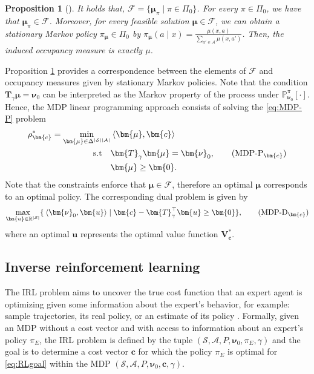 \documentclass[10pt]{article} %
\newtheorem{proposition}{Proposition}
\def\Ac{\ensuremath{\mathcal{A}}}
\def\F{\ensuremath{\mathcal{F}}}
\def\sP{{\mathbb{P}}}
\def\mTg{{\bm{T}}_\gamma}
\def\vzero{{\bm{0}}}
\def\vc{{\bm{c}}}
\def\vu{{\bm{u}}}
\def\vV{{\bm{V}}}
\def\vmu{{\bm{\mu}}}
\def\vnu{{\bm{\nu}}}
\def\evmu{{\mu}}
\newcommand{\R}{\mathbb{R}}
\newcommand{\St}{\mathcal{S}}
\begin{document}
\begin{proposition}[\cite{Puterman1994}] \label{prop:puterman}
It holds that, $\F = \{\vmu_{\pi} \mid \pi \in \Pi_0\}$. 
For every \( \pi \in \Pi_0 \), we have that \( \vmu_{\pi} \in \F \). Moreover, for every feasible solution \( \vmu \in \F \), we can obtain a stationary Markov policy \( \pi_{\vmu} \in \Pi_0 \) by $
\pi_{\vmu}(a \mid x) = \frac{\evmu(x,a)}{\sum_{a' \in \Ac} \evmu(x,a')}$.
Then, the induced occupancy measure is exactly \( \mu \).
\end{proposition}

Proposition \ref{prop:puterman} provides a correspondence between the elements of $\F$ and occupancy measures given by stationary Markov policies. Note that the condition $\mTg\vmu = \vnu_0$ can be interpreted as the Markov property of the process under $\sP^\pi_{\vnu_0}[\cdot]$. Hence, the MDP linear programming approach consists of solving the \eqref{eq:MDP-P} problem
\begin{align*}
    \rho^*_\vc=\min\limits_{\vmu \in \Delta^{|\St||\Ac|}} &\:  \langle \vmu, \vc \rangle \\
    \text{s.t}\quad &\mTg \vmu = \vnu_0, \tag{$\text{MDP-P}_\vc$} \label{eq:MDP-P}\\
    &\vmu \geq \vzero.
\end{align*}
Note that the constraints enforce that $\vmu \in \mathcal{F}$, therefore an optimal $\vmu$ corresponds to an optimal policy. The corresponding dual problem is given by
\begin{align}
   \max_{\vu \in \R^{|\St|}}\{ \: \langle \vnu_0, \vu \rangle \mid 
     \vc - \mTg^\top \vu \geq \vzero\}, \tag{$\text{MDP-D}_\vc$} \label{eq:MDP-D}
\end{align}
where an optimal $\vu$ represents the optimal value function $\vV^*_\vc$.

\subsection{Inverse reinforcement learning}\label{subsection:IRL}
The IRL problem aims to uncover the true cost function that an expert agent is optimizing given some information about the expert's behavior, for example: sample trajectories, its real policy, or an estimate of its policy \citep{Ng2000}. Formally, given an MDP without a cost vector and with access to information about an expert's policy $\pi_E$,  the IRL problem is defined by the tuple $(\St,\Ac,P, \vnu_0, \pi_{E},\gamma)$ and the goal is to determine a cost vector $\vc$ for which the policy $\pi_E$ is optimal for \eqref{eq:RLgoal} within the MDP $(\St,\Ac,P, \vnu_0, \vc,\gamma)$. \par 
\end{document}
